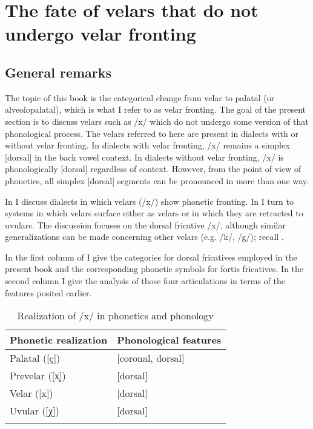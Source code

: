 \section{{The} {fate} {of} {velars} {that} {do} {not} {undergo} {velar} {fronting}}\label{sec:12.9}
\subsection{General remarks}

The topic of this book is the categorical change from velar to palatal (or alveolopalatal), which is what I refer to as velar fronting. The goal of the present section is to discuss velars such as /x/ which do not undergo some version of that phonological process. The velars referred to here are present in dialects with or without velar fronting. In dialects with velar fronting, /x/ remains a simplex [dorsal] in the back vowel context. In dialects without velar fronting, /x/ is phonologically [dorsal] regardless of context. However, from the point of view of phonetics, all simplex [dorsal] segments can be pronounced in more than one way.

In  I discuss dialects in which velars (/x/) show phonetic fronting. In  I turn to systems in which velars surface either as velars or in which they are retracted to uvulars. The discussion focuses on the dorsal fricative /x/, although similar generalizations can be made concerning other velars (e.g. /k/, /g/); recall .

In the first column of  I give the categories for dorsal fricatives employed in the present book and the corresponding phonetic symbols for fortis fricatives. In the second column I give the analysis of those four articulations in terms of the features posited earlier.

\begin{table}
\caption{Realization of /x/ in phonetics and phonology\label{tab:12.37}}
\begin{tabular}{ll}
\lsptoprule
Phonetic realization & Phonological features\\\midrule
Palatal ([ç]) & [coronal, dorsal] \\
Prevelar ([x̟]) & [dorsal] \\
Velar ([x]) & [dorsal]\\
Uvular ([χ]) & [dorsal]\\
\lspbottomrule
\end{tabular}
\end{table}

